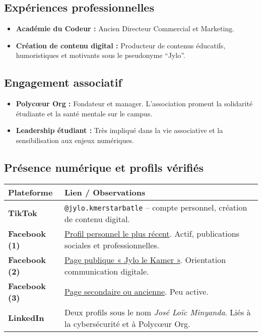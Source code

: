 \documentclass[12pt]{article}
\begin{document}
\subsection*{Expériences professionnelles}
\begin{itemize}
    \item \textbf{Académie du Codeur :} Ancien Directeur Commercial et Marketing.
    \item \textbf{Création de contenu digital :} Producteur de contenus éducatifs, humoristiques et motivants sous le pseudonyme ``Jylo''.
\end{itemize}

\subsection*{Engagement associatif}
\begin{itemize}
    \item \textbf{Polycœur Org :} Fondateur et manager. L’association promeut la solidarité étudiante et la santé mentale sur le campus.
    \item \textbf{Leadership étudiant :} Très impliqué dans la vie associative et la sensibilisation aux enjeux numériques.
\end{itemize}

\subsection*{Présence numérique et profils vérifiés}
\renewcommand{\arraystretch}{1.3}
\begin{tabular}{|>{\bfseries}m{3.5cm}|m{10cm}|}
\hline
\textbf{Plateforme} & \textbf{Lien / Observations} \\
\hline
TikTok & \texttt{@jylo.kmerstarbatle} – compte personnel, création de contenu digital. \\
\hline
Facebook (1) & \href{https://www.facebook.com/profile.php?id=61558227841643}{Profil personnel le plus récent}. Actif, publications sociales et professionnelles. \\
\hline
Facebook (2) & \href{https://www.facebook.com/jlolekamer}{Page publique « Jylo le Kamer »}. Orientation communication digitale. \\
\hline
Facebook (3) & \href{https://www.facebook.com/jylo.minbejo}{Page secondaire ou ancienne}. Peu active. \\
\hline
LinkedIn & Deux profils sous le nom \textit{José Loïc Minyanda}. Liés à la cybersécurité et à Polycœur Org. \\
\hline
\end{tabular}
\end{document}
